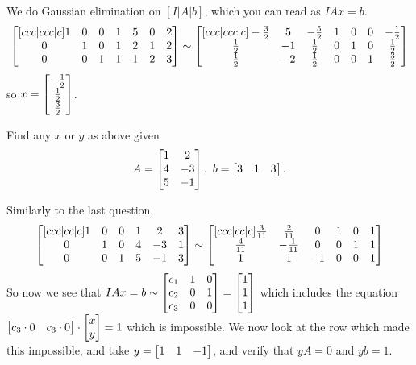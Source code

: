 \documentclass{exam}
\begin{document}
    \begin{answer}
        We do Gaussian elimination on $[I|A|b]$, which you can read as $IAx=b$.
        \[
            \matrix[ccc|ccc|c]{
            1 & 0 & 0 & 1 & 5 & 0 & 2 \\
            0 & 1 & 0 & 1 & 2 & 1 & 2 \\
            0 & 0 & 1 & 1 & 1 & 2 & 3 \\
            }
            \sim
            \matrix[ccc|ccc|c]{
            - \frac 3 2 & 5 & - \frac 5 2 & 1 & 0 & 0 & - \frac 1 2 \\
            \frac 1 2 & -1 & \frac 1 2 & 0 & 1 & 0 & \frac 1 2 \\
            \frac 1 2 & -2 & \frac 1 2 & 0 & 0 & 1 & \frac 3 2 \\
            }
        \]
        so $x = \matrix{- \frac 1 2 \\ \frac 1 2 \\ \frac 3 2}$.
    \end{answer}
    \begin{question}
        Find any $x$ or $y$ as above given
        \[
            A = \matrix{1 & 2 \\ 4 & -3 \\ 5 & -1},\ b=\matrix{3 & 1 & 3}.
        \]
    \end{question}
    \begin{answer} Similarly to the last question,
        \[
            \matrix[ccc|cc|c]{
            1 & 0 & 0 & 1 & 2 & 3 \\
            0 & 1 & 0 & 4 & -3 & 1 \\
            0 & 0 & 1 & 5 & -1 & 3 \\
            }
            \sim
            \matrix[ccc|cc|c]{
            \frac 3 {11} & \frac 2 {11} & 0 & 1 & 0 & 1\\
            \frac 4 {11} & - \frac 1 {11} & 0 & 0 & 1 & 1 \\
            1 & 1 & -1 & 0 & 0 & 1 \\
            }
        \]
        So now we see that $IAx=b \sim \matrix{c_1 & 1 & 0 \\ c_2 & 0 & 1 \\ c_3 & 0 & 0} = \matrix{1 \\ 1 \\ 1}$ which includes the equation $\matrix{c_3 \cdot 0 & c_3 \cdot 0}\cdot \matrix{x \\ y} = 1$ which is impossible.
        We now look at the row which made this impossible, and take $y=\matrix{1 & 1 & -1}$, and verify that $yA=0$ and $yb=1$.
    \end{answer}
\end{document}
